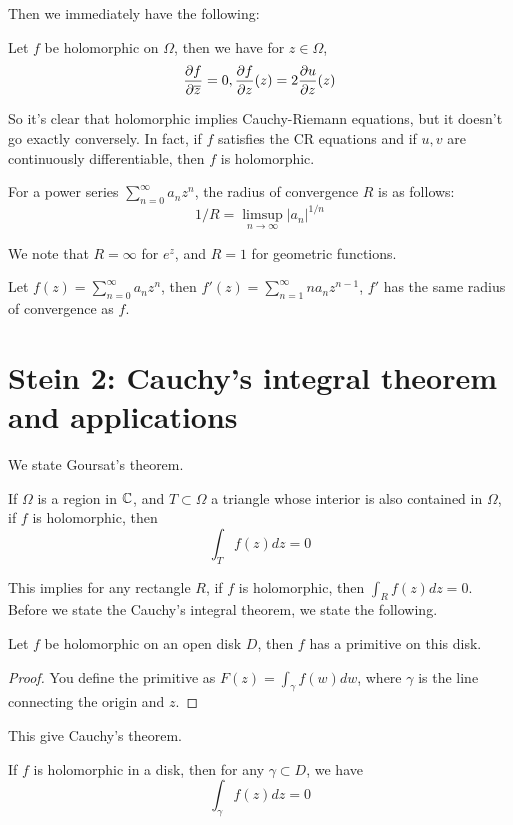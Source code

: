 Then we immediately have the following:
\begin{prop}
    Let $f$ be holomorphic on $\Omega$, then we have for $z\in\Omega$,
    \begin{equation*}
        \frac{\partial f}{\partial\overline{z}}=0, \frac{\partial f}{\partial z}(z)=2\frac{\partial u}{\partial z}(z)
    \end{equation*}
\end{prop}
So it's clear that holomorphic implies Cauchy-Riemann equations, but it doesn't go exactly conversely. In fact, if $f$ satisfies the CR equations and if $u,v$ are continuously differentiable, then $f$ is holomorphic.

\begin{defn}
    For a power series $\sum_{n=0}^\infty a_nz^n$, the radius of convergence $R$ is as follows:
    \begin{equation*}
        1/R=\limsup_{n\to\infty}|a_n|^{1/n}
    \end{equation*}
\end{defn}
We note that $R=\infty$ for $e^z$, and $R=1$ for geometric functions.
\begin{prop}
    Let $f(z)=\sum_{n=0}^\infty a_nz^n$, then $f'(z)=\sum_{n=1}^\infty na_nz^{n-1}$, $f'$ has the same radius of convergence as $f$.
\end{prop}

\chapter{Stein 2: Cauchy's integral theorem and applications}
We state Goursat's theorem.
\begin{thm}[Goursat]
    If $\Omega$ is a region in $\mathbb{C}$, and $T\subset\Omega$ a triangle whose interior is also contained in $\Omega$, if $f$ is holomorphic, then
    \begin{equation*}
        \int_Tf(z)dz=0
    \end{equation*}
\end{thm}
This implies for any rectangle $R$, if $f$ is holomorphic, then $\int_Rf(z)dz=0$. Before we state the Cauchy's integral theorem, we state the following.
\begin{thm}
    Let $f$ be holomorphic on an open disk $D$, then $f$ has a primitive on this disk.
\end{thm}
\begin{proof}
    You define the primitive as $F(z)=\int_\gamma f(w)dw$, where $\gamma$ is the line connecting the origin and $z$.
\end{proof}
This give Cauchy's theorem.
\begin{thm}
    If $f$ is holomorphic in a disk, then for any $\gamma\subset D$, we have 
    \begin{equation*}
        \int_\gamma f(z)dz=0
    \end{equation*}
\end{thm}



